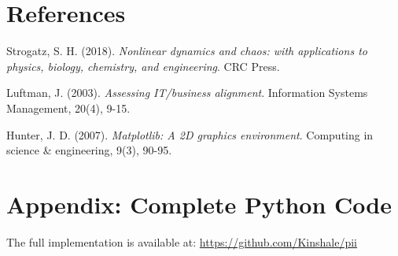 \documentclass[a4paper, 11pt]{article}
\begin{document}
%
%
%
%

\section*{References}
\begin{thebibliography}{9}
	Strogatz, S. H. (2018). \textit{Nonlinear dynamics and chaos: with applications to physics, biology, chemistry, and engineering}. CRC Press.

	Luftman, J. (2003). \textit{Assessing IT/business alignment}. Information Systems Management, 20(4), 9-15.

	Hunter, J. D. (2007). \textit{Matplotlib: A 2D graphics environment}. Computing in science \& engineering, 9(3), 90-95.
\end{thebibliography}

\appendix
\section{Appendix: Complete Python Code}
The full implementation is available at: \url{https://github.com/Kinshale/pii}
\end{document}
